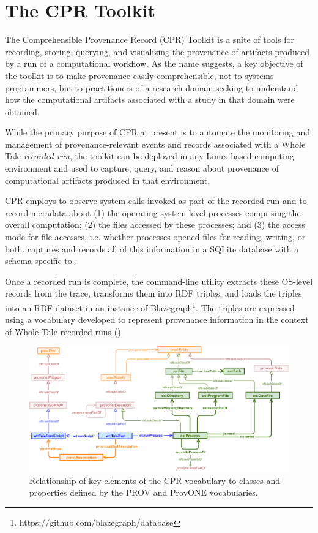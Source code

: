 \section{The CPR Toolkit}

The Comprehensible Provenance Record (CPR) Toolkit is a suite of tools for recording, storing, querying, and visualizing the provenance of artifacts produced by a run of a computational workflow. As the name suggests, a key objective of the toolkit is to make provenance easily comprehensible, not to systems programmers, but to practitioners of a research domain seeking to understand how the computational artifacts associated with a study in that domain were obtained.

While the primary purpose of CPR at present is to automate the monitoring and management of provenance-relevant events and records associated with a Whole Tale \emph{recorded run}, the toolkit can be deployed in any Linux-based computing environment and used to capture, query, and reason about provenance of computational artifacts produced in that environment.

CPR employs  \cite{rampin_reprozip_2016} to observe system calls invoked as part of the recorded run and to record metadata about (1) the operating-system level processes comprising the overall computation; (2) the files accessed by these processes; and (3) the access mode for file accesses, i.e. whether processes opened files for reading, writing, or both.  captures and records all of this information in a SQLite database with a schema specific to .

Once a recorded run is complete, the  command-line utility extracts these OS-level records from the  trace, transforms them into RDF triples, and loads the triples into an RDF dataset in an instance of Blazegraph\footnote{https://github.com/blazegraph/database}. The triples are expressed using a vocabulary developed to represent provenance information in the context of Whole Tale recorded runs (). 

\vspace*{-1.5em}
\begin{figure}[h]
    \centering
    \includegraphics[width=0.95\linewidth]{figures/cpr-vocab.pdf}
    \caption{Relationship of key elements of the CPR vocabulary to classes and properties defined by the PROV and ProvONE vocabularies.}
    \label{fig:cpr-vocab}
\end{figure}
\vspace*{-1.5em}


